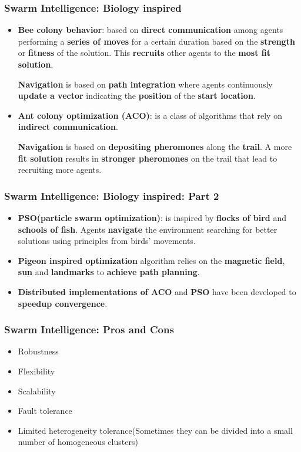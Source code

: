 \documentclass{beamer}
\begin{document}
	\begin{frame}
		\frametitle{Swarm Intelligence: Biology inspired}
		\begin{itemize}
			\item \textbf{Bee colony behavior}: based on \textbf{direct communication} among agents performing a \textbf{series of moves} for a certain duration based on the \textbf{strength} or \textbf{fitness} of the solution. This \textbf{recruits} other agents to the \textbf{most fit solution}. 
			
			\vspace{0.1in}
			\textbf{Navigation} is based on \textbf{path integration} where agents continuously \textbf{update a vector} indicating the \textbf{position} of the \textbf{start location}.
			
			\item \textbf{Ant colony optimization (ACO)}: is a class of algorithms that rely on \textbf{indirect communication}. 
			
			\vspace{0.1in}
			\textbf{Navigation} is based on \textbf{depositing pheromones} along the \textbf{trail}. A more \textbf{fit solution} results in \textbf{stronger pheromones} on the trail that lead to recruiting more agents.
		\end{itemize}
	\end{frame}

	\begin{frame}
		\frametitle{Swarm Intelligence: Biology inspired: Part 2}
		\begin{itemize}
			\item \textbf{PSO(particle swarm optimization)}: is inspired by \textbf{flocks of bird} and \textbf{schools of fish}. Agents \textbf{navigate} the environment searching for better solutions using principles from birds’ movements. 
			
			\item \textbf{Pigeon inspired optimization} algorithm relies on the \textbf{magnetic field}, \textbf{sun} and \textbf{landmarks} to \textbf{achieve path planning}.
			
			\item \textbf{Distributed implementations of ACO}  and \textbf{PSO} have been developed to \textbf{speedup convergence}.
		\end{itemize}
	\end{frame}

	\begin{frame}
		\frametitle{Swarm Intelligence: Pros and Cons}
		\begin{itemize}
			\item Robustness
			\item Flexibility
			\item Scalability
			\item Fault tolerance
			\item Limited heterogeneity tolerance(Sometimes they can be divided into a small number of homogeneous clusters)
		\end{itemize}
	\end{frame}
\end{document}
